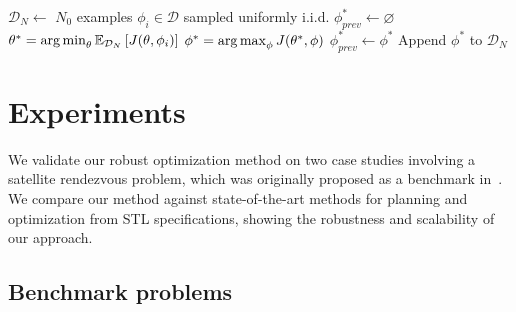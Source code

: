 \begin{algorithm}
	\caption{Counterexample-guided Gauss-Seidel method for solving robust planning problems}\label{ch:iros:alg:cg_gs}
	\DontPrintSemicolon
	$\mathcal{D}_N \gets $ $N_0$ examples $\phi_i \in \mathcal{D}$ sampled uniformly i.i.d.\;
	$\phi^*_{prev} \gets \varnothing$\;
	{
	$\theta^* = \operatorname*{arg\,min}_\theta \mathbb{E}_{\mathcal{D}_N} \left[ J(\theta, \phi_i) \right] \label{ch:iros:alg:opt_theta}$ \;
	$\phi^* = \operatorname*{arg\,max}_\phi J(\theta^*, \phi)$ \label{ch:iros:alg:opt_chi} \;
	$\phi^*_{prev} \gets \phi^*$\;
	Append $\phi^*$ to $\mathcal{D}_N$\;
	}
\end{algorithm}

\section{Experiments}\label{ch:iros:experiments}

We validate our robust optimization method on two case studies involving a satellite rendezvous problem, which was originally proposed as a benchmark in~\cite{jewisonSpacecraftBenchmarkProblem2016}. We compare our method against state-of-the-art methods for planning and optimization from STL specifications, showing the robustness and scalability of our approach.

\subsection{Benchmark problems}

